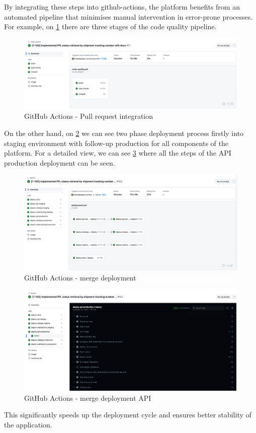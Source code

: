 By integrating these steps into \gls{github-actions}, the platform benefits from an automated pipeline that minimises manual intervention in error-prone processes.
For example, on \ref{img06:fig_github_actions_integration} there are three stages of the code quality pipeline.
\begin{figure}[H]\centering
\includegraphics[width=140mm]{img/chap06/fig_github_actions_integration.png}
\caption{GitHub Actions - Pull request integration}
\label{img06:fig_github_actions_integration}
\end{figure}
On the other hand, on \ref{img06:fig_github_actions_deployment} we can see two phase deployment process firstly into staging environment with follow-up production for all components of the platform. For a detailed view, we can see \ref{img06:fig_github_actions_api_deployment} where all the steps of the API production deployment can be seen.

\begin{figure}[H]\centering
\includegraphics[width=140mm]{img/chap06/fig_github_actions_deployment.png}
\caption{GitHub Actions - merge deployment}
\label{img06:fig_github_actions_deployment}
\end{figure}
\begin{figure}[H]\centering
\includegraphics[width=140mm]{img/chap06/fig_github_actions_api_deployment.png}
\caption{GitHub Actions - merge deployment API}
\label{img06:fig_github_actions_api_deployment}
\end{figure}

This significantly speeds up the deployment cycle and ensures better stability of the application.





